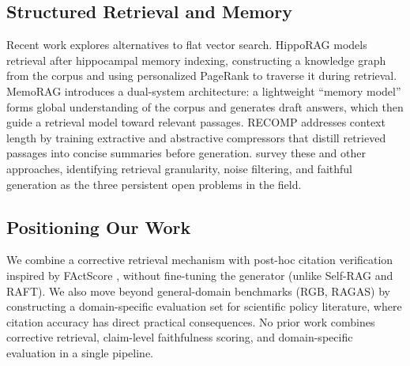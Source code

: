 \documentclass[11pt]{article}
\begin{document}
\subsection{Structured Retrieval and Memory}

Recent work explores alternatives to flat vector search. HippoRAG \cite{gutierrez2024hipporag} models retrieval after hippocampal memory indexing, constructing a knowledge graph from the corpus and using personalized PageRank to traverse it during retrieval. MemoRAG \cite{qian2024memorag} introduces a dual-system architecture: a lightweight ``memory model'' forms global understanding of the corpus and generates draft answers, which then guide a retrieval model toward relevant passages. RECOMP \cite{xu2024recomp} addresses context length by training extractive and abstractive compressors that distill retrieved passages into concise summaries before generation. \citet{gao2024retrievalaugmented} survey these and other approaches, identifying retrieval granularity, noise filtering, and faithful generation as the three persistent open problems in the field.

\subsection{Positioning Our Work}

We combine a corrective retrieval mechanism \cite{yan2024corrective} with post-hoc citation verification inspired by FActScore \cite{min-etal-2023-factscore}, without fine-tuning the generator (unlike Self-RAG and RAFT). We also move beyond general-domain benchmarks (RGB, RAGAS) by constructing a domain-specific evaluation set for scientific policy literature, where citation accuracy has direct practical consequences. No prior work combines corrective retrieval, claim-level faithfulness scoring, and domain-specific evaluation in a single pipeline.




\end{document}
